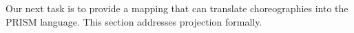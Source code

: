 %
%
%

%
Our next task is to provide a mapping that can translate
choreographies into the PRISM language. This section addresses
projection formally.

